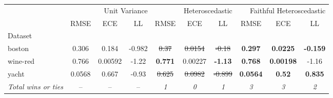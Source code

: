 \begin{tabular}{l|ccc|ccc|ccc}
\toprule
{} & \multicolumn{3}{r}{Unit Variance} & \multicolumn{3}{r}{Heteroscedastic} & \multicolumn{3}{r}{Faithful Heteroscedastic} \\
{} & {RMSE} & {ECE} & {LL} & {RMSE} & {ECE} & {LL} & {RMSE} & {ECE} & {LL} \\
{Dataset} & {} & {} & {} & {} & {} & {} & {} & {} & {} \\
\midrule
boston & 0.306 & 0.184 & -0.982 & \sout{0.37} & \sout{0.0154} & \sout{-0.18} & \textbf{0.297} & \textbf{0.0225} & \textbf{-0.159} \\
wine-red & 0.766 & 0.00592 & -1.22 & \textbf{0.771} & 0.00227 & \textbf{-1.13} & \textbf{0.768} & \textbf{0.00198} & -1.16 \\
yacht & 0.0568 & 0.667 & -0.93 & \sout{0.625} & \sout{0.0982} & \sout{-0.899} & \textbf{0.0564} & \textbf{0.52} & \textbf{0.835} \\
\textit{{Total wins or ties}} & -- & -- & -- & \textit{1} & \textit{0} & \textit{1} & \textit{3} & \textit{3} & \textit{2} \\
\bottomrule
\end{tabular}
